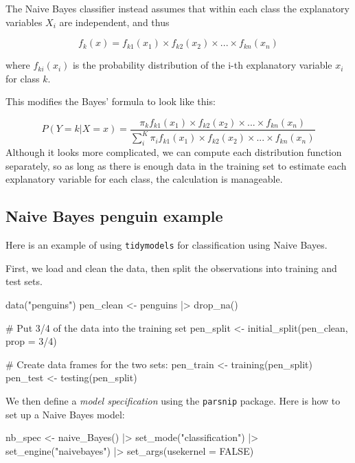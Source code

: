 \documentclass[
  letterpaper,
  DIV=11,
  numbers=noendperiod]{scrreprt}
\newenvironment{Shaded}{\begin{snugshade}}{\end{snugshade}}
\newcommand{\NormalTok}[1]{\textcolor[rgb]{0.00,0.23,0.31}{#1}}
\begin{document}
The Naive Bayes classifier instead assumes that within each class the
explanatory variables \(X_i\) are independent, and thus

\[
f_k(x) = f_{k1} (x_1) \times f_{k2} (x_2) \times ... \times f_{kn} (x_n)
\]

where \(f_{ki}(x_i)\) is the probability distribution of the i-th
explanatory variable \(x_i\) for class \(k\).

This modifies the Bayes' formula to look like this:

\[
P(Y = k | X = x) = \frac{\pi_k f_{k1} (x_1) \times f_{k2} (x_2) \times ... \times f_{kn} (x_n)}{\sum_i^K \pi_i f_{k1} (x_1) \times f_{k2} (x_2) \times ... \times f_{kn} (x_n)}
\]Although it looks more complicated, we can compute each distribution
function separately, so as long as there is enough data in the training
set to estimate each explanatory variable for each class, the
calculation is manageable.

\subsection{Naive Bayes penguin
example}\label{naive-bayes-penguin-example}

Here is an example of using \texttt{tidymodels} for classification using
Naive Bayes.

First, we load and clean the data, then split the observations into
training and test sets.

\begin{Shaded}
\begin{Highlighting}[]
\NormalTok{data("penguins")}
\NormalTok{pen\_clean \textless{}{-} penguins |\textgreater{} drop\_na()}

\NormalTok{\# Put 3/4 of the data into the training set }
\NormalTok{pen\_split \textless{}{-} initial\_split(pen\_clean, prop = 3/4)}

\NormalTok{\# Create data frames for the two sets:}
\NormalTok{pen\_train \textless{}{-} training(pen\_split)}
\NormalTok{pen\_test  \textless{}{-} testing(pen\_split)}
\end{Highlighting}
\end{Shaded}

We then define a \emph{model specification} using the \texttt{parsnip}
package. Here is how to set up a Naive Bayes model:

\begin{Shaded}
\begin{Highlighting}[]
\NormalTok{nb\_spec \textless{}{-} naive\_Bayes() |\textgreater{} }
\NormalTok{  set\_mode("classification") |\textgreater{} }
\NormalTok{  set\_engine("naivebayes") |\textgreater{} }
\NormalTok{  set\_args(usekernel = FALSE)  }
\end{Highlighting}
\end{Shaded}
\end{document}
